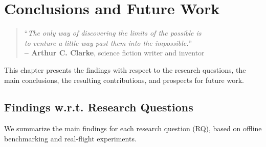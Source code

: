 %
\chapter{Conclusions and Future Work}
\label{cha:concl}
%
\begin{quote}
\begin{flushright}
``\emph{The only way of discovering the limits of the possible is}\\
  \emph{to venture a little way past them into the impossible.}'' \\
\textbf{-- Arthur C. Clarke}, science fiction writer and inventor
\end{flushright}
\end{quote}

This chapter presents the findings with respect to the research questions, the
main conclusions, the resulting contributions, and prospects for future work.

\section{Findings w.r.t. Research Questions}
We summarize the main findings for each research question (RQ), based on offline
benchmarking and real-flight experiments.

